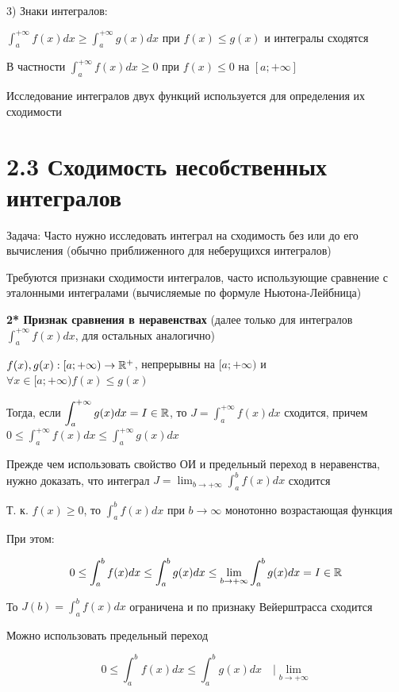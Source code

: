 \documentclass[12pt]{article}
\begin{document}
    3) Знаки интегралов:

    $\displaystyle \int^{+\infty}_{a} f(x) dx \geq \int^{+\infty}_{a} g(x) dx $ при $f(x) \leq g(x)$ и интегралы сходятся

    В частности $\displaystyle \int^{+\infty}_{a} f(x) dx \geq 0$ при $f(x) \leq 0$ на $[a; +\infty]$

    \Nota Исследование интегралов двух функций используется для определения их сходимости


    \section{2.3 Сходимость несобственных интегралов}

    Задача: Часто нужно исследовать интеграл на сходимость без или до его вычисления (обычно приближенного для неберущихся интегралов)

    Требуются признаки сходимости интегралов, часто использующие сравнение с эталонными интегралами (вычисляемые по формуле Ньютона-Лейбница)

    \textbf{2* Признак сравнения в неравенствах} (далее только для интегралов $\displaystyle \int^{+\infty}_{a} f(x) dx$, для остальных аналогично)

    $f(x), g(x) : [a;+\infty) \to \mathbb{R}^+$, непрерывны на $[a;+\infty)$ и $\forall x \in [a;+\infty) f(x) \leq g(x)$


    Тогда, если $\displaystyle \int^{+\infty}_{a} g(x) dx = I \in \mathbb{R}$, то $\displaystyle J = \int^{+\infty}_{a} f(x) dx$ сходится,
    причем $\displaystyle0 \leq \int^{+\infty}_{a} f(x) dx \leq \int^{+\infty}_{a} g(x) dx$

    Прежде чем использовать свойство ОИ и предельный переход в неравенства,
    нужно доказать, что интеграл $\displaystyle J = \lim_{b \to +\infty} \int^{b}_{a} f(x) dx$ сходится

    Т. к. $f(x) \geq 0$, то $\displaystyle \int^{b}_{a}f(x)dx$ при $b \to \infty$ монотонно возрастающая функция

    При этом:

    \[0 \leq \int^{b}_{a}f(x)dx \leq \int^{b}_{a}g(x)dx \leq \lim_{b \to +\infty} \int^{b}_{a}g(x)dx = I \in \mathbb{R}\]

    То $\displaystyle J(b) = \int^b_a f(x)dx$ ограничена и по признаку Вейерштрасса сходится

    Можно использовать предельный переход

    \[0 \leq \int^{b}_{a}f(x)dx \leq \int^{b}_{a}g(x)dx \quad \Big| \lim_{b \to +\infty}\]
\end{document}
